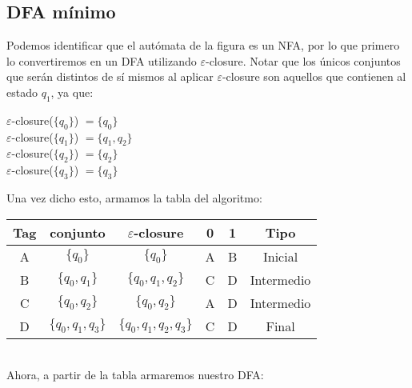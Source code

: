 \documentclass[spanish]{article}
\begin{document}
    \subsection{DFA mínimo}
        Podemos identificar que el autómata de la figura es un NFA, por lo que primero lo convertiremos en un DFA utilizando $\varepsilon$-closure.
        Notar que los únicos conjuntos que serán distintos de sí mismos al aplicar $\varepsilon$-closure son aquellos que contienen al estado $q_1$, ya que:
        \begin{center}
          $\varepsilon$-closure($\{q_0\}$) $= \{q_0\}$\\
          $\varepsilon$-closure($\{q_1\}$) $= \{q_1, q_2\}$\\
          $\varepsilon$-closure($\{q_2\}$) $= \{q_2\}$\\
          $\varepsilon$-closure($\{q_3\}$) $= \{q_3\}$
        \end{center}
        Una vez dicho esto, armamos la tabla del algoritmo:
          \begin{table}[H]
            \centering
            \begin{tabular}{|c|c|c|c|c|c|}
              \hline
              Tag & conjunto & $\varepsilon$-closure & 0 & 1 & Tipo \\ 
              \hline
              A & $\{q_0\}$ & $\{q_0\}$ & A & B & Inicial\\
              \hline
              B & $\{q_0,q_1\}$ & $\{q_0,q_1,q_2\}$ & C & D & Intermedio\\ 
              \hline
              C & $\{q_0,q_2\}$ & $\{q_0,q_2\}$ & A & D & Intermedio\\
              \hline
              D & $\{q_0,q_1,q_3\}$ & $\{q_0,q_1,q_2,q_3\}$ & C & D & Final\\
              \hline
            \end{tabular}
          \end{table}
        \\
        Ahora, a partir de la tabla armaremos nuestro DFA:\\
\end{document}
